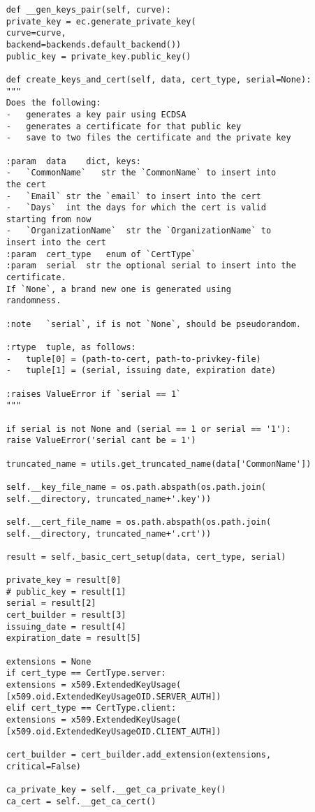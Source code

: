 \begin{verbatim}
	def __gen_keys_pair(self, curve):
	private_key = ec.generate_private_key(
	curve=curve,
	backend=backends.default_backend())
	public_key = private_key.public_key()
	
	def create_keys_and_cert(self, data, cert_type, serial=None):
	"""
	Does the following:
	-   generates a key pair using ECDSA
	-   generates a certificate for that public key
	-   save to two files the certificate and the private key
	
	:param  data    dict, keys:
	-   `CommonName`   str the `CommonName` to insert into
	the cert
	-   `Email` str the `email` to insert into the cert
	-   `Days`  int the days for which the cert is valid
	starting from now
	-   `OrganizationName`  str the `OrganizationName` to
	insert into the cert
	:param  cert_type   enum of `CertType`
	:param  serial  str the optional serial to insert into the
	certificate.
	If `None`, a brand new one is generated using
	randomness.
	
	:note   `serial`, if is not `None`, should be pseudorandom.
	
	:rtype  tuple, as follows:
	-   tuple[0] = (path-to-cert, path-to-privkey-file)
	-   tuple[1] = (serial, issuing date, expiration date)
	
	:raises ValueError if `serial == 1`
	"""
	
	if serial is not None and (serial == 1 or serial == '1'):
	raise ValueError('serial cant be = 1')
	
	truncated_name = utils.get_truncated_name(data['CommonName'])
	
	self.__key_file_name = os.path.abspath(os.path.join(
	self.__directory, truncated_name+'.key'))
	
	self.__cert_file_name = os.path.abspath(os.path.join(
	self.__directory, truncated_name+'.crt'))
	
	result = self._basic_cert_setup(data, cert_type, serial)
	
	private_key = result[0]
	# public_key = result[1]
	serial = result[2]
	cert_builder = result[3]
	issuing_date = result[4]
	expiration_date = result[5]
	
	extensions = None
	if cert_type == CertType.server:
	extensions = x509.ExtendedKeyUsage(
	[x509.oid.ExtendedKeyUsageOID.SERVER_AUTH])
	elif cert_type == CertType.client:
	extensions = x509.ExtendedKeyUsage(
	[x509.oid.ExtendedKeyUsageOID.CLIENT_AUTH])
	
	cert_builder = cert_builder.add_extension(extensions,
	critical=False)
	
	ca_private_key = self.__get_ca_private_key()
	ca_cert = self.__get_ca_cert()
	

\end{verbatim}

